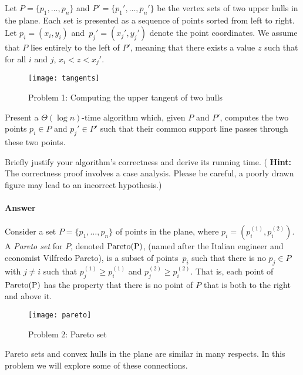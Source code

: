 \documentclass{article}
\newcommand{\pareto}[1]{\rm{Pareto}(#1)}
\begin{document}
Let $P = \{ p_1, \ldots, p_n \}$ and $P' = \{ p_1', \ldots, p_n' \}$ be the
vertex sets of two upper hulls in the plane.  Each set is presented as a
sequence of points sorted from left to right.  Let $p_i = (x_i, y_i)$ and~$p_j'
= (x_j', y_j')$ denote the point coordinates.  We assume that $P$ lies entirely
to the left of $P'$, meaning that there exists a value $z$ such that for all
$i$ and $j$, $x_i < z < x_j'$.

\begin{figure}[h]
    \centering
    \texttt{[image: tangents]}
    \caption{Problem 1: Computing the upper tangent of two hulls}
\end{figure}

Present a $\Theta(\log n)$-time algorithm which, given $P$ and $P'$, computes the two
points $p_i \in P$ and $p_j' \in P'$ such that their common support line passes
through these two points.

Briefly justify your algorithm's correctness and derive its running time.  ({\bf
Hint:} The correctness proof involves a case analysis.  Please be careful, a
poorly drawn figure may lead to an incorrect hypothesis.)

\paragraph{Answer}


\collab{\todo{}}

Consider a set $P = \{p_1, \ldots, p_n \}$ of points in the plane, where $p_i =
(p_i^{(1)}, p_i^{(2)})$. A \emph{Pareto set} for $P$, denoted $\pareto{P}$, (named after
the Italian engineer and economist Vilfredo Pareto), is a subset of
points~$p_i$ such that there is no $p_j \in P$ with $j \neq i$ such that $p_j^{(1)}
\geq p_i^{(1)}$ and
$p_j^{(2)} \geq p_i^{(2)}$.  That is, each point of $\pareto{P}$ has the property that
there is no point of $P$ that is both to the right and above it.

\begin{figure}[h]
    \centering
    \texttt{[image: pareto]}
    \caption{Problem 2: Pareto set}
\end{figure}

Pareto sets and convex hulls in the plane are similar in many respects.  In
this problem we will explore some of these connections.
\end{document}
